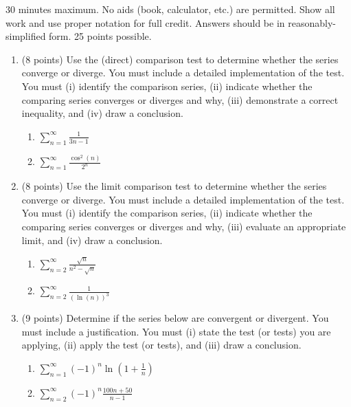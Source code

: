 \documentclass[12pt]{article}
\newcommand{\ds}{\displaystyle}
\begin{document}
30 minutes maximum.  No aids (book, calculator, etc.) are permitted.  Show all work and use proper notation for full credit.  Answers should be in reasonably-simplified form.  25 points possible.

\begin{enumerate}
\item (8 points) Use the (direct) comparison test to determine whether the series converge or diverge. You must include a detailed implementation of the test. You must (i) identify the comparison series, (ii) indicate whether the comparing series converges or diverges and why, (iii) demonstrate a correct inequality, and (iv) draw a conclusion.
	\begin{enumerate}
	\item $\ds \sum_{n=1}^{\infty} \frac{1}{3n-1}$
	\vfill
	\item $\ds \sum_{n=1}^{\infty} \frac{\cos^2(n)}{2^n}$
	\vfill
	\end{enumerate}
\newpage
\item (8 points) Use the limit comparison test to determine whether the series converge or diverge. You must include a detailed implementation of the test. You must (i) identify the comparison series, (ii) indicate whether the comparing series converges or diverges and why, (iii) evaluate an appropriate limit, and (iv) draw a conclusion.
	\begin{enumerate}
	\item $\ds \sum_{n=2}^{\infty} \frac{\sqrt{n}}{n^2-\sqrt{n}}$
	\vfill
	\item $\ds \sum_{n=2}^{\infty} \frac{1}{(\ln(n))^3}$
	\vfill
	\end{enumerate}
\newpage
\item (9 points) Determine if the series below are  convergent or divergent. You must include a justification. You must (i) state the test (or tests) you are applying, (ii) apply the test (or tests), and (iii) draw a conclusion.
	\begin{enumerate}
	\item $\ds \sum_{n=1}^{\infty} (-1)^n \ln(1+\frac{1}{n})$ 
	\vfill
	\item $\ds \sum_{n=2}^{\infty} (-1)^{n}\frac{100n+50}{n-1} $
	\vfill
	\end{enumerate}
\end{enumerate}
\end{document}
